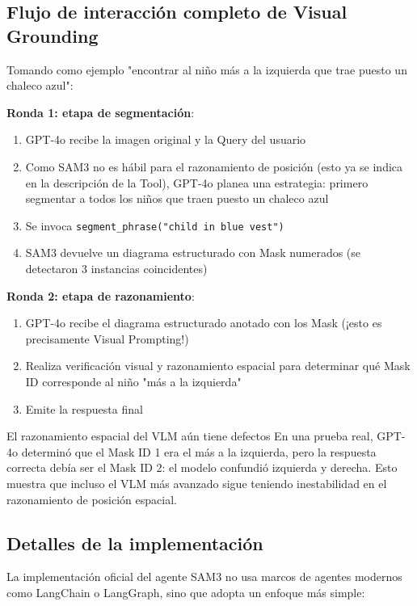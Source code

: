 \subsection{Flujo de interacción completo de Visual Grounding}

Tomando como ejemplo "encontrar al niño más a la izquierda que trae puesto un chaleco azul":

\textbf{Ronda 1: etapa de segmentación}:
\begin{enumerate}
    \item GPT-4o recibe la imagen original y la Query del usuario
    \item Como SAM3 no es hábil para el razonamiento de posición (esto ya se indica en la descripción de la Tool), GPT-4o planea una estrategia: primero segmentar a todos los niños que traen puesto un chaleco azul
    \item Se invoca \texttt{segment\_phrase("child in blue vest")}
    \item SAM3 devuelve un diagrama estructurado con Mask numerados (se detectaron 3 instancias coincidentes)
\end{enumerate}

\textbf{Ronda 2: etapa de razonamiento}:
\begin{enumerate}
    \item GPT-4o recibe el diagrama estructurado anotado con los Mask (¡esto es precisamente Visual Prompting!)
    \item Realiza verificación visual y razonamiento espacial para determinar qué Mask ID corresponde al niño "más a la izquierda"
    \item Emite la respuesta final
\end{enumerate}

\begin{warningbox}{El razonamiento espacial del VLM aún tiene defectos}
En una prueba real, GPT-4o determinó que el Mask ID 1 era el más a la izquierda, pero la respuesta correcta debía ser el Mask ID 2: el modelo confundió izquierda y derecha. Esto muestra que incluso el VLM más avanzado sigue teniendo inestabilidad en el razonamiento de posición espacial.
\end{warningbox}

\subsection{Detalles de la implementación}

La implementación oficial del agente SAM3 no usa marcos de agentes modernos como LangChain o LangGraph, sino que adopta un enfoque más simple:

